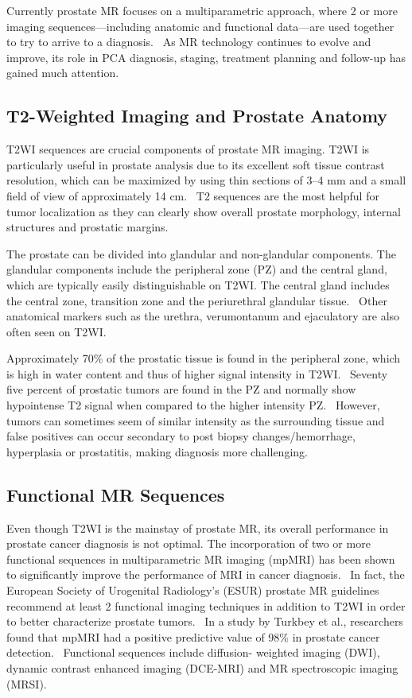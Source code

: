 Currently prostate MR focuses on a multiparametric approach, where 2 or more
imaging sequences—including anatomic and functional data—are used together to
try to arrive to a diagnosis.~\cite{Barentsz2012} As MR technology continues to evolve and
improve, its role in PCA diagnosis, staging, treatment planning and follow-up
has gained much attention.

\subsection{T2-Weighted Imaging and Prostate Anatomy}
T2WI sequences are crucial components of prostate MR imaging.  T2WI is
particularly useful in prostate analysis due to its excellent soft tissue
contrast resolution, which can be maximized by using thin sections of 3--4 mm
and a small field of view of approximately 14 cm.~\cite{Gupta2013,Bonekamp2011}
T2 sequences are the most helpful for tumor localization as they can clearly
show overall prostate morphology, internal structures and prostatic
margins.~\cite{Gupta2013}

The prostate can be divided into glandular and non-glandular components. The
glandular components include the peripheral zone (PZ) and the central gland,
which are typically easily distinguishable on T2WI. The central gland includes
the central zone, transition zone and the periurethral glandular
tissue.~\cite{Jung2012} Other anatomical markers such as the urethra,
verumontanum and ejaculatory are also often seen on T2WI. 

Approximately 70\% of the prostatic tissue is found in the peripheral zone,
which is high in water content and thus of higher signal intensity in
T2WI.~\cite{Jung2012} Seventy five percent of prostatic tumors are found in the
PZ and normally show hypointense T2 signal when compared to the higher
intensity PZ.~\cite{Hricak2007,Hegde2013} However, tumors can sometimes seem of
similar intensity as the surrounding tissue and false positives can occur
secondary to post biopsy changes/hemorrhage, hyperplasia or prostatitis, making
diagnosis more challenging.~\cite{Hegde2013}

\subsection{Functional MR Sequences}
Even though T2WI is the mainstay of prostate MR, its overall performance in
prostate cancer diagnosis is not optimal. The incorporation of two or more
functional sequences in multiparametric MR imaging (mpMRI) has been shown to
significantly improve the performance of MRI in cancer
diagnosis.~\cite{Turkbey2012} In fact, the European Society of Urogenital
Radiology’s (ESUR) prostate MR guidelines recommend at least 2 functional
imaging techniques in addition to T2WI in order to better characterize prostate
tumors.~\cite{Barentsz2012} In a study by Turkbey et al., researchers found
that mpMRI had a positive predictive value of 98\% in prostate cancer
detection.~\cite{Turkbey2012} Functional sequences include diffusion- weighted
imaging (DWI), dynamic contrast enhanced imaging (DCE-MRI) and MR spectroscopic
imaging (MRSI). 

